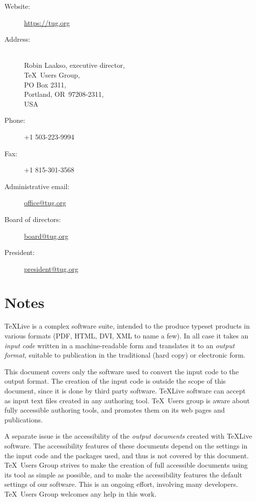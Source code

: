 \documentclass[titlepage]{article}
\begin{document}
  \begin{description}
  \item[Website:]  \url{https://tug.org}
  \item[Address:] \leavevmode\\
    Robin Laakso, executive director,\\
    \TeX\ Users Group,\\
    PO Box 2311,\\
    Portland, OR~97208-2311,\\
    USA
  \item[Phone:] +1 503-223-9994
  \item[Fax:] +1 815-301-3568
  \item[Administrative email:] \href{mailto:office@tug.org}{office@tug.org}
  \item[Board of directors:] \href{mailto:board@tug.org}{board@tug.org}
  \item[President:] \href{mailto:president@tug.org}{president@tug.org}
  \end{description}

\newpage

\section{Notes}
\label{sec:note}

  
\TeX Live is a complex software suite, intended to the produce typeset
products in various formats (PDF, HTML, DVI, XML to name a few).  In
all case it takes an \emph{input code} written in a machine-readable
form and translates it to an \emph{output format,} suitable to
publication in the traditional (hard copy) or electronic form.

This document covers only the software used to convert the input code
to the output format.  The creation of the input code is outside the
scope of this document, since it is done by third party software.
\TeX Live software can accept as input text files created in any
authoring tool.  \TeX\ Users group is aware about fully accessible
authoring tools, and promotes them on its web pages and publications.

A separate issue is the accessibility of the \emph{output documents}
created with \TeX Live software.  The accessibility features of these
documents depend on the settings in the input code and the packages
used, and thus is not covered by this document.  \TeX\ Users Group
strives to make the creation of full accessible documents using its
tool as simple as possible, and to make the accessibility features the
default settings of our software.  This is an ongoing effort,
involving many developers.  \TeX\ Users Group welcomes any help in
this work.
\end{document}
